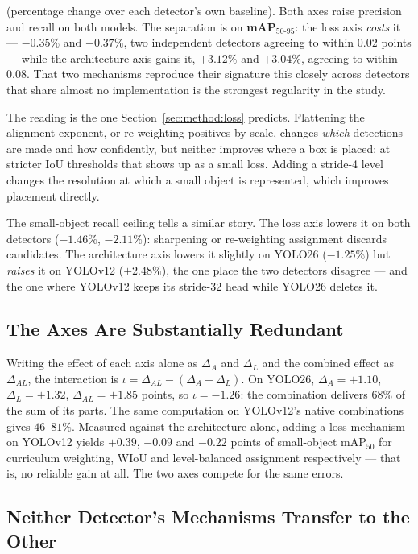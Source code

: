 \documentclass[10pt,twocolumn,a4paper]{article}
\begin{document}
\noindent (percentage change over each detector's own baseline). Both axes raise
precision and recall on both models. The separation is on
\textbf{mAP$_{50\text{-}95}$}: the loss axis \emph{costs} it --- $-0.35\%$ and
$-0.37\%$, two independent detectors agreeing to within $0.02$ points --- while
the architecture axis gains it, $+3.12\%$ and $+3.04\%$, agreeing to within
$0.08$. That two mechanisms reproduce their signature this closely across
detectors that share almost no implementation is the strongest regularity in the
study.

The reading is the one Section~\ref{sec:method:loss} predicts. Flattening the
alignment exponent, or re-weighting positives by scale, changes \emph{which}
detections are made and how confidently, but neither improves where a box is
placed; at stricter IoU thresholds that shows up as a small loss. Adding a
stride-4 level changes the resolution at which a small object is represented,
which improves placement directly.

The small-object recall ceiling tells a similar story. The loss axis lowers it
on both detectors ($-1.46\%$, $-2.11\%$): sharpening or re-weighting assignment
discards candidates. The architecture axis lowers it slightly on YOLO26
($-1.25\%$) but \emph{raises} it on YOLOv12 ($+2.48\%$), the one place the two
detectors disagree --- and the one where YOLOv12 keeps its stride-32 head while
YOLO26 deletes it.

\subsection{The Axes Are Substantially Redundant}
\label{sec:results:redundant}

Writing the effect of each axis alone as $\Delta_A$ and $\Delta_L$ and the
combined effect as $\Delta_{AL}$, the interaction is
$\iota = \Delta_{AL} - (\Delta_A + \Delta_L)$. On YOLO26,
$\Delta_A = +1.10$, $\Delta_L = +1.32$, $\Delta_{AL} = +1.85$ points, so
$\iota = -1.26$: the combination delivers $68\%$ of the sum of its parts. The
same computation on YOLOv12's native combinations gives $46$--$81\%$. Measured
against the architecture alone, adding a loss mechanism on YOLOv12 yields
$+0.39$, $-0.09$ and $-0.22$ points of small-object mAP$_{50}$ for curriculum
weighting, WIoU and level-balanced assignment respectively --- that is, no
reliable gain at all. The two axes compete for the same errors.

\subsection{Neither Detector's Mechanisms Transfer to the Other}
\label{sec:results:transfer}
\end{document}
